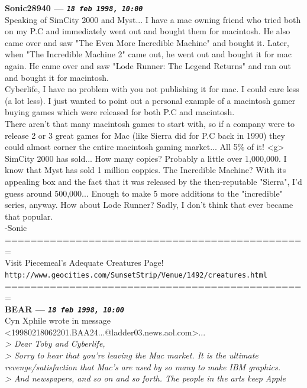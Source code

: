 \documentclass[11pt,twoside,a4paper]{article}
\begin{document}
\begin{multicols*}{2}
 
		
	
		
\textbf{Sonic28940 --- \emph{\texttt{18 feb 1998, 10:00}}}~\\

Speaking of SimCity 2000 and Myst... I have a mac owning friend who tried both on my P.C and immediately went out and bought them for macintosh. He also came over and saw "The Even More Incredible Machine" and bought it. Later, when "The Incredible Machine 2" came out, he went out and bought it for mac again. He came over and saw "Lode Runner: The Legend Returns" and ran out and bought it for macintosh.~\\

Cyberlife, I have no problem with you not publishing it for mac. I could care less (a lot less). I just wanted to point out a personal example of a macintosh gamer buying games which were released for both P.C and macintosh.~\\

There aren't that many macintosh games to start with, so if a company were to release 2 or 3 great games for Mac (like Sierra did for P.C back in 1990) they could almost corner the entire macintosh gaming market... All 5\% of it! <g>~\\

SimCity 2000 has sold... How many copies? Probably a little over 1,000,000. I know that Myst has sold 1 million coppies. The Incredible Machine? With its appealing box and the fact that it was released by the then-reputable "Sierra", I'd guess around 500,000... Enough to make 5 more additions to the "incredible" series, anyway. How about Lode Runner? Sadly, I don't think that ever became that popular.~\\

-Sonic~\\

===============================================~\\
Visit Piecemeal's Adequate Creatures Page!~\\
\texttt{http://www.geocities.com/SunsetStrip/Venue/1492/creatures.html}~\\
===============================================~\\

 
		
	
		
\textbf{BEAR --- \emph{\texttt{18 feb 1998, 10:00}}}~\\

Cyn Xphile wrote in message <19980218062201.BAA24...@ladder03.news.aol.com>...~\\
\emph{> Dear Toby and Cyberlife,}~\\
\emph{> Sorry to hear that you're leaving the Mac market.  It is the ultimate revenge/satisfaction that Mac's are used by so many to make IBM graphics.}~\\
\emph{> And newspapers, and so on and so forth.  The people in the arts keep Apple}~\\


\end{multicols*}
\end{document}
